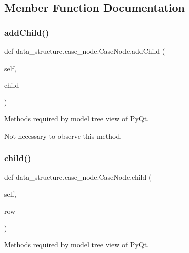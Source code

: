 \subsection{Member Function Documentation}
\hypertarget{classdata__structure_1_1case__node_1_1_case_node_a5be02db2416888d37bf33c148a97bc0c}{}\label{classdata__structure_1_1case__node_1_1_case_node_a5be02db2416888d37bf33c148a97bc0c} 
\subsubsection{\texorpdfstring{add\+Child()}{addChild()}}
{\footnotesize\ttfamily def data\+\_\+structure.\+case\+\_\+node.\+Case\+Node.\+add\+Child (\begin{DoxyParamCaption}\item[{}]{self,  }\item[{}]{child }\end{DoxyParamCaption})}



Methods required by model tree view of Py\+Qt. 

Not necessary to observe this method. \hypertarget{classdata__structure_1_1case__node_1_1_case_node_ac5303eb8bbab69954feaa7205ba778aa}{}\label{classdata__structure_1_1case__node_1_1_case_node_ac5303eb8bbab69954feaa7205ba778aa} 
\subsubsection{\texorpdfstring{child()}{child()}}
{\footnotesize\ttfamily def data\+\_\+structure.\+case\+\_\+node.\+Case\+Node.\+child (\begin{DoxyParamCaption}\item[{}]{self,  }\item[{}]{row }\end{DoxyParamCaption})}



Methods required by model tree view of Py\+Qt. 

